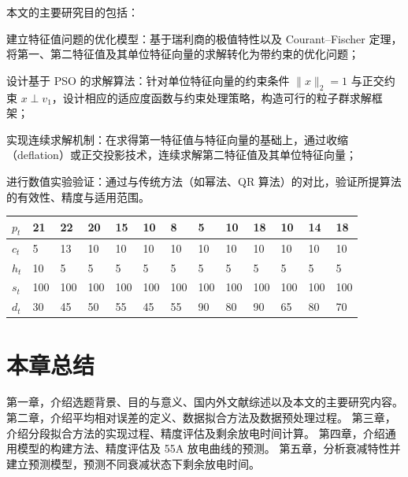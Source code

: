 本文的主要研究目的包括：

建立特征值问题的优化模型：基于瑞利商的极值特性以及 Courant–Fischer 定理，将第一、第二特征值及其单位特征向量的求解转化为带约束的优化问题；

设计基于 PSO 的求解算法：针对单位特征向量的约束条件 $\|x\|_2 = 1$ 与正交约束 $x \perp v_1$，设计相应的适应度函数与约束处理策略，构造可行的粒子群求解框架；

实现连续求解机制：在求得第一特征值与特征向量的基础上，通过收缩（deflation）或正交投影技术，连续求解第二特征值及其单位特征向量；

进行数值实验验证：通过与传统方法（如幂法、QR 算法）的对比，验证所提算法的有效性、精度与适用范围。

	\begin{table}[!ht]
		\label{tab:lable} %
		\begin{tabular*}{\hsize}{@{}@{\extracolsep{\fill}}lllllllllllll@{}}
			\toprule
			$p_{t}$  &21  &22  &20  &15  &10  &8   &5   &10  &18  &10  &14  &18\\
			\midrule
			$c_{t}$  &5   &13  &10  &10  &10  &10  &10  &10  &10  &10  &10  &10\\
			$h_{t}$  &10  &5   &5   &5   &5   &5   &5   &5   &5   &5   &5   &5 \\
			$s_{t}$  &100 &100 &100 &100 &100 &100 &100 &100 &100 &100 &100 &100\\
			$d_{t}$  &30  &45  &50  &55  &45  &55  &90  &80  &90  &65  &80  &70 \\
			\bottomrule
		\end{tabular*}
	\end{table}


\section{本章总结}


第一章，介绍选题背景、目的与意义、国内外文献综述以及本文的主要研究内容。
第二章，介绍平均相对误差的定义、数据拟合方法及数据预处理过程。
第三章，介绍分段拟合方法的实现过程、精度评估及剩余放电时间计算。
第四章，介绍通用模型的构建方法、精度评估及 55A 放电曲线的预测。
第五章，分析衰减特性并建立预测模型，预测不同衰减状态下剩余放电时间。

